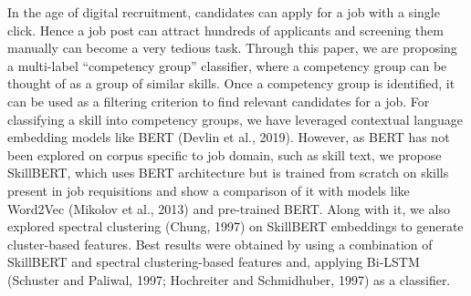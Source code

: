 In the age of digital recruitment, candidates can apply for a job with a single click. Hence a job post can attract hundreds of applicants and screening them manually can become a very tedious task. Through this paper, we are proposing a multi-label ``competency group'' classifier, where a competency group can be thought of as a group of similar skills. Once a competency group is identified, it can be used as a filtering criterion to find relevant candidates for a job. For classifying a skill into competency groups, we have leveraged contextual language embedding models like BERT (Devlin et al., 2019). However, as BERT has not been explored on corpus specific to job domain, such as skill text, we propose SkillBERT, which uses BERT architecture but is trained from scratch on skills present in job requisitions and show a comparison of it with models like Word2Vec (Mikolov et al., 2013) and pre-trained BERT. Along with it, we also explored spectral clustering (Chung, 1997) on SkillBERT embeddings to generate cluster-based features. Best results were obtained by using a combination of SkillBERT and spectral clustering-based features and, applying Bi-LSTM (Schuster and Paliwal, 1997; Hochreiter and Schmidhuber, 1997) as a classifier.
